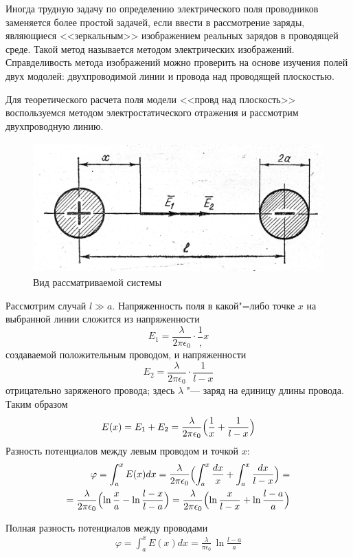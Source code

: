 Иногда трудную задачу по определению электрического поля проводников заменяется более простой задачей, если ввести в рассмотрение заряды, являющиеся <<зеркальным>> изображением реальных зарядов в проводящей среде. Такой метод называется методом электрических изображений. Справделивость метода изображений можно проверить на основе изучения полей двух модолей: двухпроводимой линии и провода над проводящей плоскостью.

Для теоретического расчета поля модели <<провд над плоскость>> воспользуемся методом электростатического отражения и рассмотрим двухпроводную линию.
\begin{figure}[H]
  \centering
  \includegraphics[height = 5cm]{example.png}
  \caption*{Вид рассматриваемой системы}
\end{figure}
Рассмотрим случай $l \gg a$. Напряженность поля в какой"=либо точке $x$ на выбранной линии сложится из напряженности 
$$
  E_1 = \frac{\lambda}{2\pi\epsilon_0} \cdot \frac{1},{x}
$$
создаваемой положительным проводом, и напряженности 
$$
  E_2 = \frac{\lambda}{2\pi\epsilon_0} \cdot \frac{1}{l - x}
$$
отрицательно заряженого провода; здесь $\lambda$ "--- заряд на единицу длины провода. Таким образом
$$
  E(x) = E_1 + E_2 = \frac{\lambda}{2\pi\epsilon_0}\Bigl(\frac{1}{x} + \frac{1}{l - x}\Bigr)
$$
Разность потенциалов между левым проводом и точкой $x$:
\begin{align*}
  \varphi = \int_{a}^{x} E(x)dx = \frac{\lambda}{2\pi\epsilon_0}\Bigl(\int_{a}^{x} \frac{dx}{x} + \int_{a}^{x}\frac{dx}{l - x}\Bigr) = \\
  = \frac{\lambda}{2\pi\epsilon_0}\Bigl(\ln{\frac{x}{a}} - \ln{\frac{l - x}{l - a}}\Bigr) = \frac{\lambda}{2\pi\epsilon_0}\Bigl(\ln{\frac{x}{l - x}} + \ln{\frac{l - a}{a}}\Bigr)
\end{align*}

Полная разность потенциалов между проводами
\begin{align*}
  \varphi = \int_{a}^{x} E(x)dx = \frac{\lambda}{\pi\epsilon_0}\, \ln{\frac{l - a}{a}}
\end{align*}

